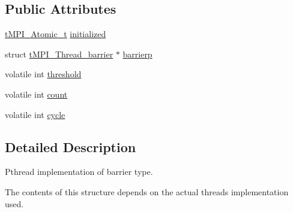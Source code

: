 \subsection*{\-Public \-Attributes}
\begin{DoxyCompactItemize}
\item 
\hyperlink{include_2thread__mpi_2atomic_2gcc_8h_a2c33794dc540e3b07cffc1f81a3fe4b4}{t\-M\-P\-I\-\_\-\-Atomic\-\_\-t} \hyperlink{structtMPI__Thread__barrier__t_a56df7eb38ea75c2306d16551f29aca3e}{initialized}
\item 
struct \hyperlink{structtMPI__Thread__barrier}{t\-M\-P\-I\-\_\-\-Thread\-\_\-barrier} $\ast$ \hyperlink{structtMPI__Thread__barrier__t_a5ab0b29030c34815aebcf5ffa473da94}{barrierp}
\item 
volatile int \hyperlink{structtMPI__Thread__barrier__t_a237aad70c322000adfa99d786590a443}{threshold}
\item 
volatile int \hyperlink{structtMPI__Thread__barrier__t_af149a62c5428560120715ee46deaa387}{count}
\item 
volatile int \hyperlink{structtMPI__Thread__barrier__t_ab539784dad836102168a2ae13341c9f1}{cycle}
\end{DoxyCompactItemize}


\subsection{\-Detailed \-Description}
\-Pthread implementation of barrier type. 

\-The contents of this structure depends on the actual threads implementation used. 

